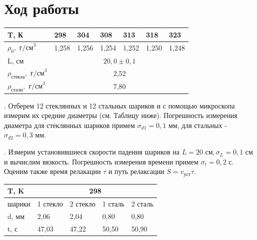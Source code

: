 \documentclass[a4paper,12pt]{article} %
\begin{document}
\section{Ход работы}

\begin{table}[h!]
\begin{tabular}{|l|clllll|}
\hline
T, К                                 & \multicolumn{1}{l|}{298}   & \multicolumn{1}{l|}{304}   & \multicolumn{1}{l|}{308}   & \multicolumn{1}{l|}{313}   & \multicolumn{1}{l|}{318}   & 323   \\ \hline
$\rho_0, \text{ г/см}^3$             & \multicolumn{1}{l|}{1,258} & \multicolumn{1}{l|}{1,256} & \multicolumn{1}{l|}{1,254} & \multicolumn{1}{l|}{1,252} & \multicolumn{1}{l|}{1,250} & 1,248 \\ \hline
L, см                                & \multicolumn{6}{c|}{$20,0 \pm 0,1$}                                                                                                                    \\ \hline
$\rho_\text{стекла}, \text{ г/см}^3$ & \multicolumn{6}{c|}{2,52}                                                                                                                              \\ \hline
$\rho_\text{стали}, \text{ г/см}^3$  & \multicolumn{6}{c|}{7,80}                                                                                                                              \\ \hline
\end{tabular}
\end{table}

. Отберем 12 стеклянных и 12 стальных шариков и с помощью микроскопа измерим их средние диаметры (см. Таблицу ниже). Погрешность измерения диаметра для стеклянных шариков примем $\sigma_{d1} = 0,1 \text{ мм}$, для стальных - $\sigma_{d2} = 0,3 \text{ мм}$.

\medskip

. Измерим установившиеся скорости падения шариков на $L = 20 \text{ см}, \sigma_L = 0,1 \text{ см}$ и вычислим вязкость. Погрешность измерения времени примем $\sigma_t = 0,2 \text{ с}$. Оценим также время релакации $\tau$ и путь релаксации $S = v_\text{уст} \tau$.

\begin{table}[h!]
\begin{tabular}{|l|llll|}
\hline
T,  K  & \multicolumn{4}{c|}{298}                                                                               \\ \hline
шарики & \multicolumn{1}{l|}{1 стекло} & \multicolumn{1}{l|}{2 стекло} & \multicolumn{1}{l|}{1 сталь} & 2 сталь \\ \hline
d, мм  & \multicolumn{1}{l|}{2,06}     & \multicolumn{1}{l|}{2,04}     & \multicolumn{1}{l|}{0,80}    & 0,80    \\ \hline
t, с   & \multicolumn{1}{l|}{47,03}    & \multicolumn{1}{l|}{47,22}    & \multicolumn{1}{l|}{50,50}   & 50,90   \\ \hline
\end{tabular}
\end{table}
\end{document}
